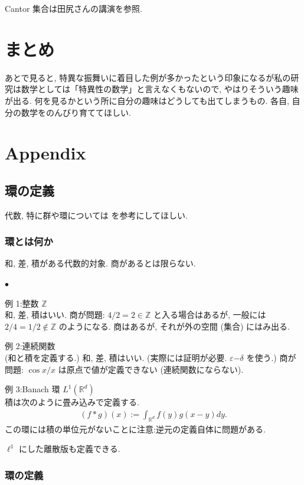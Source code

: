 \documentclass[openany, a4paper, oneside]{jsbook}
\newcounter{enum2}
\renewenvironment{itemize}{%
\begin{list}{$\bullet$\ \ }%
{%
\usecounter{enum2}
\setlength{\itemindent}{0pt}%
\setlength{\leftmargin}{15pt}%
\setlength{\rightmargin}{0pt}%
\setlength{\labelsep}{0pt}%
\setlength{\labelwidth}{6pt}%
\setlength{\itemsep}{0pt}%
\setlength{\parsep}{0pt}%
\setlength{\listparindent}{0pt}%
}
}{%
\end{list}%
}
\theoremstyle{break}
\theoremstyle{breakdefn}
\begin{document}
Cantor 集合は田尻さんの講演を参照.
\section{まとめ}


あとで見ると, 特異な振舞いに着目した例が多かったという印象になるが私の研究は数学としては「特異性の数学」と言えなくもないので,
やはりそういう趣味が出る.
何を見るかという所に自分の趣味はどうしても出てしまうもの.
各自, 自分の数学をのんびり育ててほしい.
\section{Appendix}

\subsection{環の定義}


代数, 特に群や環については \cite{ToshiyukiKatsura1} を参考にしてほしい.
\subsubsection{環とは何か}


和, 差, 積がある代数的対象.
商があるとは限らない.
\begin{itemize}

\item 例 1:整数 $\mathbb{Z}$\\
%
和, 差, 積はいい.
商が問題: $4/2 = 2 \in \mathbb{Z}$ と入る場合はあるが, 一般には $2/4 = 1/2 \notin \mathbb{Z}$ のようになる.
商はあるが, それが外の空間 (集合) にはみ出る.

\item 例 2:連続関数\\
%
(和と積を定義する.)
和, 差, 積はいい. (実際には証明が必要. $\varepsilon \mathrm{-} \delta$ を使う.)
商が問題: $\cos x / x$ は原点で値が定義できない (連続関数にならない).

\item 例 3:Banach 環 $L^1 (\mathbb{R}^d)$\\
%
積は次のように畳み込みで定義する.
\begin{align}
 (f*g) (x)
 :=
 \int_{\mathbb{R}^d} f (y) g (x - y) dy.
\end{align}
この環には積の単位元がないことに注意:逆元の定義自体に問題がある.

$\ell^1$ にした離散版も定義できる.
\end{itemize} %
\subsubsection{環の定義}
\end{document}
